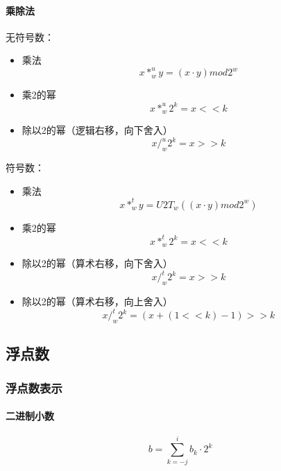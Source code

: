 \paragraph{乘除法}

无符号数：
\begin{itemize}
    \item 乘法
          $$
              x *_w^u y = (x \cdot y) mod 2^w
          $$
    \item 乘2的幂
          $$
              x *_w^u 2^k = x << k
          $$
    \item 除以2的幂（逻辑右移，向下舍入）
          $$
              x /_w^u 2^k = x >> k
          $$
\end{itemize}




符号数：
\begin{itemize}
    \item 乘法
          $$
              x *_w^t y = U2T_w((x \cdot y) mod 2^w)
          $$
    \item 乘2的幂
          $$
              x *_w^t 2^k = x << k
          $$
    \item 除以2的幂（算术右移，向下舍入）
          $$
              x /_w^t 2^k = x >> k
          $$
    \item 除以2的幂（算术右移，向上舍入）
          $$
              x /_w^t 2^k = (x + (1 << k) - 1) >> k
          $$
\end{itemize}

\subsection{浮点数}
\subsubsection{浮点数表示}

\paragraph{二进制小数}
$$ b = \sum_{k=-j}^{i} b_k \cdot 2^k $$

